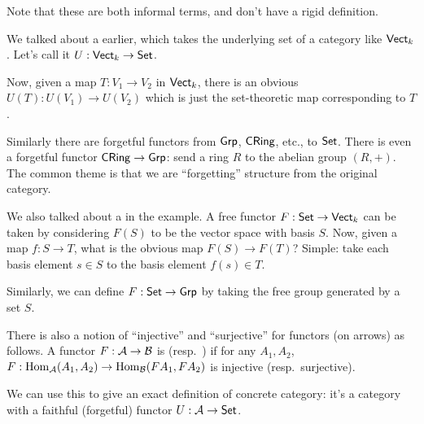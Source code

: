 \begin{example}
	Note that these are both informal terms,
	and don't have a rigid definition.
	\begin{enumerate}[(a)]
		\ii We talked about a  earlier,
		which takes the underlying set of a category like $\mathsf{Vect}_k$.
		Let's call it $U : \mathsf{Vect}_k \to \mathsf{Set}$.

		Now, given a map $T : V_1 \to V_2$ in $\mathsf{Vect}_k$,
		there is an obvious $U(T) : U(V_1) \to U(V_2)$ which is just
		the set-theoretic map corresponding to $T$.

		Similarly there are forgetful functors from
		$\mathsf{Grp}$, $\mathsf{CRing}$, etc., to $\mathsf{Set}$.
		There is even a forgetful functor $\mathsf{CRing} \to \mathsf{Grp}$:
		send a ring $R$ to the abelian group $(R,+)$.
		The common theme is that we are ``forgetting'' structure
		from the original category.

		\ii We also talked about a  in the example.
		A free functor $F : \mathsf{Set} \to \mathsf{Vect}_k$ can be taken by considering
		$F(S)$ to be the vector space with basis $S$.
		Now, given a map $f : S \to T$, what is the obvious map $F(S) \to F(T)$?
		Simple: take each basis element $s \in S$ to the basis element $f(s) \in T$.

		Similarly, we can define $F : \mathsf{Set} \to \mathsf{Grp}$
		by taking the free group generated by a set $S$.
	\end{enumerate}
\end{example}
\begin{remark}
	There is also a notion of ``injective'' and ``surjective'' for functors (on arrows) as follows.
	A functor $F : \mathcal A \to \mathcal B$ is  (resp.\ ) if for any $A_1, A_2$,
	$F : \operatorname{Hom}_\mathcal A(A_1, A_2) \to \operatorname{Hom}_\mathcal B(FA_1, FA_2)$ is injective (resp.\ surjective).

	We can use this to give an exact definition of concrete category:
	it's a category with a faithful (forgetful) functor $U: \mathcal A \to \mathsf{Set}$.
\end{remark}

